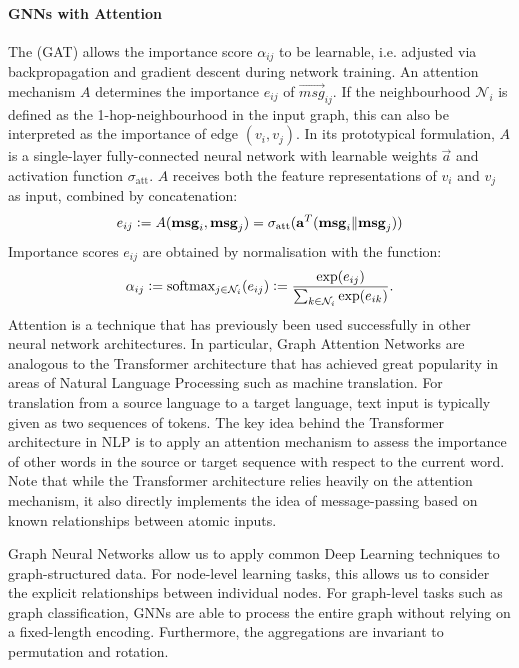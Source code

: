 \documentclass[
	fontsize=10pt, %
	twoside=false, %
	secnumdepth=1, %
  toc=indentunnumbered %
]{kaobook}
\begin{document}
\paragraph{GNNs with Attention} The  (GAT)
\cite{velickovic_graph_2018} allows the importance score $\alpha_{ij}$ to be learnable, i.e.
adjusted via backpropagation and gradient descent during network training. An
attention mechanism $A$ determines the importance $e_{ij}$ of $\vec{msg}_{ij}$.
If the neighbourhood $\mathcal{N}_i$ is defined as the 1-hop-neighbourhood in
the input graph, this can also be interpreted as the importance of edge $(v_i,
v_j)$. In its prototypical formulation, $A$ is a single-layer fully-connected
neural network with learnable weights $\vec a$ and activation function
$\sigma_{\text{att}}$. $A$ receives
both the feature representations of $v_i$ and $v_j$ as input, combined by
concatenation:
\begin{align}
  e_{ij} := A(\mathbf{msg}_i, \mathbf{msg}_j) = \sigma_{\text{att}}(\mathbf{a}^T( \mathbf{msg}_i \| \mathbf{msg}_j))
\end{align}
Importance scores $e_{ij}$ are obtained by normalisation with the  function:
\begin{align}
  \alpha_{ij} := \text{softmax}_{j \in \mathcal{N}_i}(e_{ij}) := \frac{\exp(e_{ij})}{\sum_{k \in \mathcal{N}_i} \exp(e_{ik})}.
  \label{eq:softmax}
\end{align}
Attention is a technique that has previously been used successfully in other
neural network architectures. In particular, Graph Attention Networks are
analogous to the Transformer architecture \cite{vaswani_AttentionAllYou_2017}
that has achieved great popularity in areas of Natural Language
Processing such as machine translation.
For translation from a source language
to a target language, text input is typically given as two sequences of tokens.
The key idea behind the Transformer architecture in NLP is to apply an attention
mechanism to assess the importance of other words in the source or target
sequence with respect to the current word.
Note that while the Transformer architecture relies heavily on the attention
mechanism, it also directly implements the idea of message-passing based on
known relationships between atomic inputs.

Graph Neural Networks allow us to apply common Deep Learning techniques to
graph-structured data. For node-level learning tasks, this allows us to consider
the explicit relationships between individual nodes. For graph-level tasks such
as graph classification, GNNs are able to process the entire graph without
relying on a fixed-length encoding. Furthermore, the aggregations are invariant
to permutation and rotation.
\end{document}
